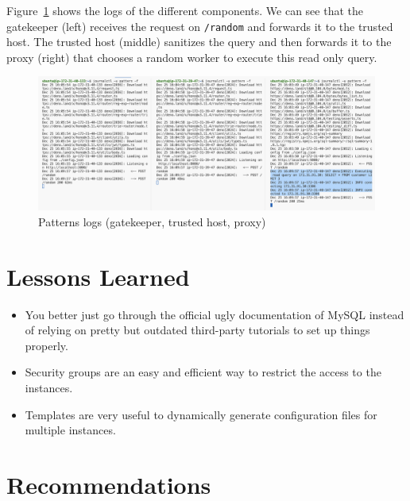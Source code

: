 \documentclass[letterpaper,headings=standardclasses,parskip=half]{scrartcl}
\begin{document}
Figure~\ref{fig:patterns_logs} shows the logs of the different components. We can see that the gatekeeper (left) receives the request on \texttt{/random} and forwards it to the trusted host. The trusted host (middle) sanitizes the query and then forwards it to the proxy (right) that chooses a random worker to execute this read only query.

\begin{figure}[h]
    \centering
    \includegraphics[width=\linewidth]{figures/Screenshot 2023-12-25 at 17.11.34.png}
    \caption{Patterns logs (gatekeeper, trusted host, proxy)}
    \label{fig:patterns_logs}
\end{figure}

\section{Lessons Learned}

\begin{itemize}
    \item You better just go through the official ugly documentation of MySQL instead of relying on pretty but outdated third-party tutorials to set up things properly.
    \item Security groups are an easy and efficient way to restrict the access to the instances.
    \item Templates are very useful to dynamically generate configuration files for multiple instances.
\end{itemize}

\section{Recommendations}
\end{document}
